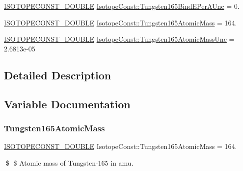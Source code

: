 \begin{DoxyCompactItemize}
\mbox{\hyperlink{group___isotope_const-_macros_ga8f45a7272ce02c0b4c65c44636ed719a}{I\+S\+O\+T\+O\+P\+E\+C\+O\+N\+S\+T\+\_\+\+D\+O\+U\+B\+LE}} \mbox{\hyperlink{group___isotope_const-_tungsten-_w165_ga42d1725270a9efa361c7221ccda77cca}{Isotope\+Const\+::\+Tungsten165\+Bind\+E\+Per\+A\+Unc}} = 0.
\item 
\mbox{\hyperlink{group___isotope_const-_macros_ga8f45a7272ce02c0b4c65c44636ed719a}{I\+S\+O\+T\+O\+P\+E\+C\+O\+N\+S\+T\+\_\+\+D\+O\+U\+B\+LE}} \mbox{\hyperlink{group___isotope_const-_tungsten-_w165_ga91b992e255ec91439e24489900fb90ed}{Isotope\+Const\+::\+Tungsten165\+Atomic\+Mass}} = 164.
\item 
\mbox{\hyperlink{group___isotope_const-_macros_ga8f45a7272ce02c0b4c65c44636ed719a}{I\+S\+O\+T\+O\+P\+E\+C\+O\+N\+S\+T\+\_\+\+D\+O\+U\+B\+LE}} \mbox{\hyperlink{group___isotope_const-_tungsten-_w165_ga109033c23778db6d0508356b5345c1de}{Isotope\+Const\+::\+Tungsten165\+Atomic\+Mass\+Unc}} = 2.\+6813e-\/05
\end{DoxyCompactItemize}


\subsection{Detailed Description}


\subsection{Variable Documentation}
\mbox{\label{group___isotope_const-_tungsten-_w165_ga91b992e255ec91439e24489900fb90ed}} 
\subsubsection{\texorpdfstring{Tungsten165\+Atomic\+Mass}{Tungsten165AtomicMass}}
{\footnotesize\ttfamily \mbox{\hyperlink{group___isotope_const-_macros_ga8f45a7272ce02c0b4c65c44636ed719a}{I\+S\+O\+T\+O\+P\+E\+C\+O\+N\+S\+T\+\_\+\+D\+O\+U\+B\+LE}} Isotope\+Const\+::\+Tungsten165\+Atomic\+Mass = 164.}

\$ \$ Atomic mass of Tungsten-\/165 in amu. \mbox{\label{group___isotope_const-_tungsten-_w165_ga109033c23778db6d0508356b5345c1de}} 
